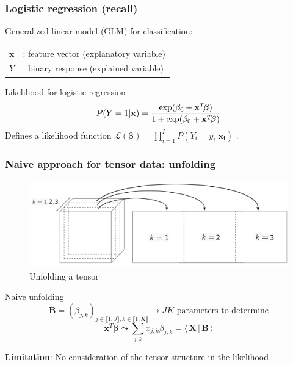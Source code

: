 \documentclass{beamer}
\begin{document}
\begin{frame}
    \frametitle{Logistic regression (recall)}
    Generalized linear model (GLM) for classification:\\[15 pt]
    \begin{tabular}{ll}
        $\mathbf{x}$ & \hspace{-8 pt}: feature vector (explanatory variable)\hspace{5 cm} \\[5 pt]
        $Y$ & \hspace{-8 pt}: binary response (explained variable) \hspace{10 cm}
    \end{tabular}
\vspace{5 pt}
\begin{block}{Likelihood for logistic regression}
$$P(Y = 1|\mathbf{x}) = \frac{\exp(\beta_0 + \mathbf{x}^T\hspace{-2 pt}\bm{\beta})}{1 + \exp(\beta_0 + \mathbf{x}^T\hspace{-2 pt}\bm{\beta})}$$
Defines a likelihood function $\mathcal{L}(\bm{\beta}) = \prod_{i = 1}^I P(Y_i = y_i|\mathbf{x_i})$ .
\end{block}

\end{frame}

\begin{frame}
    \frametitle{Naive approach for tensor data: unfolding}
    \begin{figure}
        \centering
        \includegraphics[scale = 0.15]{images/deplier.png}
        \caption{Unfolding a tensor}
    \end{figure}
    \begin{block}{Naive unfolding}
    $$\mathbf{B} = (\beta_{j,k})_{j \in \llbracket 1, J\rrbracket, k \in \llbracket 1, K\rrbracket} \rightarrow JK\text{ parameters to determine}$$ 
    $$\mathbf{x}^T \bm{\beta} \leadsto \sum\limits_{j,k} x_{j,k} \beta_{j,k} = \langle \, \mathbf{X} \, | \, \mathbf{B}\, \rangle$$
    \end{block}
    \textbf{Limitation}: No consideration of the tensor structure in the likelihood
    
    
\end{frame}
\end{document}
